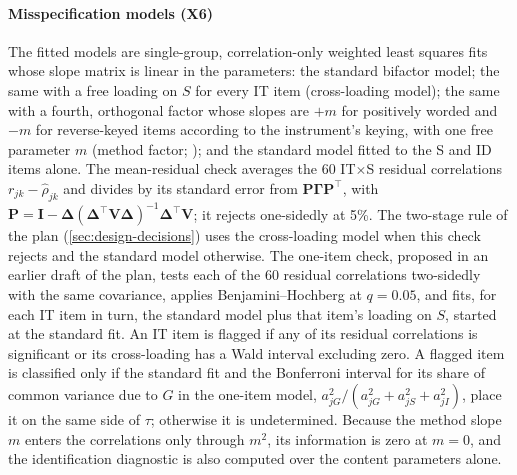 \paragraph{Misspecification models (X6)}
The fitted models are single-group, correlation-only weighted least squares fits whose slope matrix is linear in the parameters: the standard bifactor model; the same with a free loading on $S$ for every IT item (cross-loading model); the same with a fourth, orthogonal factor whose slopes are $+m$ for positively worded and $-m$ for reverse-keyed items according to the instrument's keying, with one free parameter $m$ (method factor; \citealp{maydeuolivares2006}); and the standard model fitted to the S and ID items alone. The mean-residual check averages the 60 IT$\times$S residual correlations $r_{jk}-\hat\rho_{jk}$ and divides by its standard error from $\bm P\bm\Gamma\bm P^\top$, with $\bm P=\bm I-\bm\Delta(\bm\Delta^\top\bm V\bm\Delta)^{-1}\bm\Delta^\top\bm V$; it rejects one-sidedly at 5\%. The two-stage rule of the plan (\cref{sec:design-decisions}) uses the cross-loading model when this check rejects and the standard model otherwise. The one-item check, proposed in an earlier draft of the plan, tests each of the 60 residual correlations two-sidedly with the same covariance, applies Benjamini--Hochberg at $q=0.05$, and fits, for each IT item in turn, the standard model plus that item's loading on $S$, started at the standard fit. An IT item is flagged if any of its residual correlations is significant or its cross-loading has a Wald interval excluding zero. A flagged item is classified only if the standard fit and the Bonferroni interval for its share of common variance due to $G$ in the one-item model, $a_{jG}^2/(a_{jG}^2+a_{jS}^2+a_{jI}^2)$, place it on the same side of $\tau$; otherwise it is undetermined. Because the method slope $m$ enters the correlations only through $m^2$, its information is zero at $m=0$, and the identification diagnostic is also computed over the content parameters alone.

